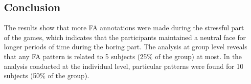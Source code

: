 \subsection{Conclusion}


The results show that more FA annotations were made during the stressful part of the games, which indicates that the participants maintained a neutral face for longer periods of time during the boring part. The analysis at group level reveals that any FA pattern is related to 5 subjects (25\% of the group) at most. In the analysis conducted at the individual level, particular patterns were found for 10 subjects (50\% of the group).

